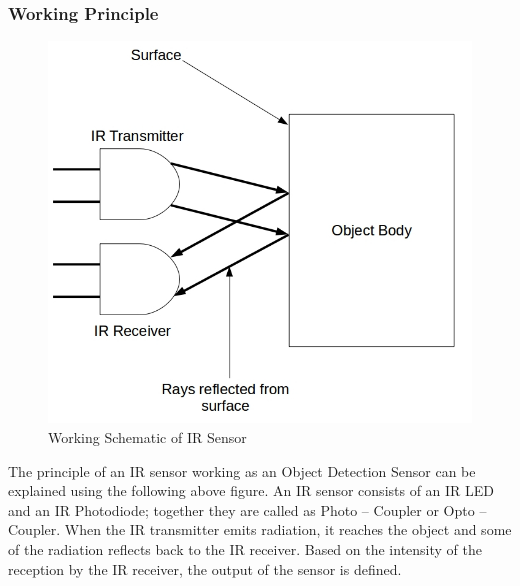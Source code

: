 \subsubsection{Working Principle }
\begin{figure}[h]
\center
\includegraphics[scale=0.5]{IRpair.jpg} 
\caption{Working Schematic of IR Sensor }
\end{figure}
\justify The principle of an IR sensor working as an Object Detection Sensor can be explained using the following above figure. An IR sensor consists of an IR LED and an IR Photodiode; together they are called as Photo – Coupler or Opto – Coupler.
When the IR transmitter emits radiation, it reaches the object and some of the radiation reflects back to the IR receiver. Based on the intensity of the reception by the IR receiver, the output of the sensor is defined.
